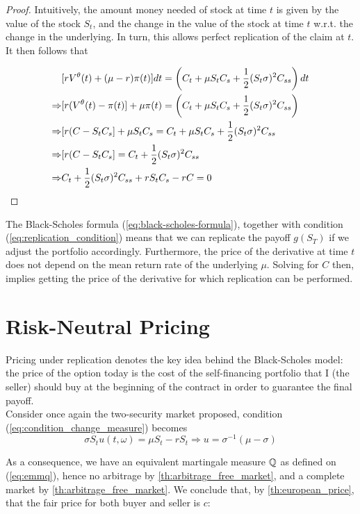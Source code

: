 \documentclass[../TGMAFFIRO.tex]{subfiles}
\begin{document}
\begin{proof}
	Intuitively, the amount money needed of stock at time $t$ is given by the value of the stock $S_t$, and the change in the value of the stock at time $t$ w.r.t. the change in the underlying. In turn, this allows perfect replication of the claim at $t$. It then follows that
	
	\begin{align}
		&[rV^\theta(t) + (\mu - r) \pi(t)] dt = \left(C_t + \mu S_t C_s + \frac{1}{2}(S_t\sigma)^2C_{ss} \right) dt\nonumber\\
		\Rightarrow & [r(V^\theta(t) - \pi(t)] + \mu\pi(t) = \left(C_t + \mu S_t C_s + \frac{1}{2}(S_t\sigma)^2C_{ss} \right) \nonumber\\
		\Rightarrow &[r(C - S_t C_s] + \mu S_t C_s = C_t + \mu S_t C_s + \frac{1}{2}(S_t\sigma)^2C_{ss} \nonumber \\
		\Rightarrow &[r(C - S_t C_s] = C_t + \frac{1}{2}(S_t\sigma)^2C_{ss} \nonumber \\
		\Rightarrow & C_t + \frac{1}{2}(S_t\sigma)^2C_{ss} + rS_t C_s - rC = 0
	\end{align}
 \end{proof}
 
 \begin{remark}
 	The Black-Scholes formula (\ref{eq:black-scholes-formula}), together with condition (\ref{eq:replication_condition}) means that we can replicate the payoff $g(S_T)$ if we adjust the portfolio accordingly. Furthermore, the price of the derivative at time $t$ does not depend on the mean return rate of the underlying $\mu$. Solving for $C$ then, implies getting the price of the derivative for which replication can be performed.
 \end{remark}
 
 \section{Risk-Neutral Pricing}
  Pricing under replication denotes the key idea behind the Black-Scholes model: the price of the option today is the cost of the self-financing portfolio that I (the seller) should buy at the beginning of the contract in order to guarantee the final payoff.\\
 
  Consider once again the two-security market proposed, condition (\ref{eq:condition_change_measure}) becomes
\[
	\sigma S_t u(t,\omega) = \mu S_t - r S_t \Rightarrow u = \sigma^{-1}(\mu - \sigma)
\]


As a consequence, we have an equivalent martingale measure $\mathbb{Q}$ as defined on (\ref{eq:emmq}), hence no arbitrage by \ref{th:arbitrage_free_market}, and a complete market by \ref{th:arbitrage_free_market}. We conclude that, by \ref{th:european_price}, that the fair price for both buyer and seller is $c$:
\end{document}
